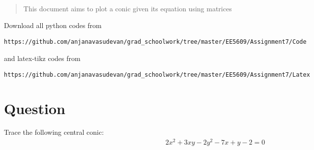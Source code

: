 \documentclass[journal,12pt,twocolumn]{IEEEtran}
\begin{document}
%
\maketitle
\begin{abstract}
This document aims to plot a conic given its equation using matrices
\end{abstract}
Download all python codes from
%
\begin{lstlisting}
https://github.com/anjanavasudevan/grad_schoolwork/tree/master/EE5609/Assignment7/Code
\end{lstlisting}
%
and latex-tikz codes from
%
\begin{lstlisting}
https://github.com/anjanavasudevan/grad_schoolwork/tree/master/EE5609/Assignment7/Latex
\end{lstlisting}
%
\section{Question}
Trace the following central conic:
\begin{align}
  2x^2 + 3xy - 2y^2 - 7x + y - 2 = 0 \label{eq:1}
\end{align}
\end{document}
